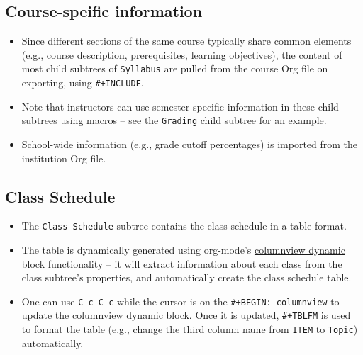 \documentclass[10pt,article]{article}
\begin{document}
\subsection{Course-speific information}
\label{sec:org200c51f}
\begin{itemize}
\item Since different sections of the same course typically share common elements (e.g.,
course description, prerequisites, learning objectives), the
content of most child subtrees of \texttt{Syllabus} are pulled from the course Org
file on exporting, using \texttt{\#+INCLUDE}.
\item Note that instructors can use semester-specific information in these child
subtrees using macros -- see the \texttt{Grading} child subtree for an example.
\item School-wide information (e.g., grade cutoff percentages) is imported
from the institution Org file.
\end{itemize}
\subsection{Class Schedule}
\label{sec:org810f02d}
\begin{itemize}
\item The \texttt{Class Schedule} subtree contains the class schedule in a table format.
\item The table is dynamically generated using org-mode's \href{https://orgmode.org/manual/Capturing-column-view.html\#Capturing-column-view}{columnview dynamic block}
functionality -- it will extract information about each class from the class
subtree's properties, and automatically create the class schedule table.

\item One can use \texttt{C-c C-c} while the cursor is on the \texttt{\#+BEGIN: columnview} to
update the columnview dynamic block. Once it is updated, \texttt{\#+TBLFM} is used
to format the table (e.g., change the third column name from \texttt{ITEM} to
\texttt{Topic}) automatically.
\end{itemize}
\end{document}
